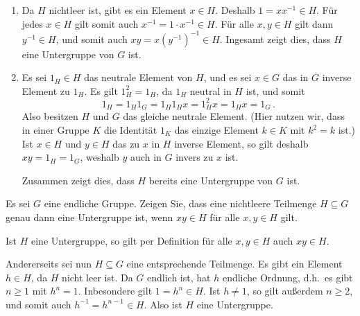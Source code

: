 \begin{solution}
  \begin{enumerate}
    \item
      Da $H$ nichtleer ist, gibt es ein Element $x \in H$.
      Deshalb $1 = x x^{-1} \in H$.
      Für jedes $x \in H$ gilt somit auch $x^{-1} = 1 \cdot x^{-1} \in H$.
      Für alle $x, y \in H$ gilt dann $y^{-1} \in H$, und somit auch $xy = x (y^{-1})^{-1} \in H$.
      Ingesamt zeigt dies, dass $H$ eine Untergruppe von $G$ ist.
    \item
      Es sei $1_H \in H$ das neutrale Element von $H$, und es sei $x \in G$ das in $G$ inverse Element zu $1_H$.
      Es gilt $1_H^2 = 1_H$, da $1_H$ neutral in $H$ ist, und somit
      \[
          1_H
        = 1_H 1_G
        = 1_H 1_H x
        = 1_H^2 x
        = 1_H x
        = 1_G \,.
      \]
      Also besitzen $H$ und $G$ das gleiche neutrale Element.
      (Hier nutzen wir, dass in einer Gruppe $K$ die Identität $1_K$ das einzige Element $k \in K$ mit $k^2 = k$ ist.)
      Ist $x \in H$ und $y \in H$ das zu $x$ in $H$ inverse Element, so gilt deshalb $xy = 1_H = 1_G$, weshalb $y$ auch in $G$ invers zu $x$ ist.
      
      Zusammen zeigt dies, dass $H$ bereits eine Untergruppe von $G$ ist.
  \end{enumerate}
\end{solution}


\begin{question}[subtitle = Untergruppen von endlichen Gruppen]
  Es sei $G$ eine endliche Gruppe.
  Zeigen Sie, dass eine nichtleere Teilmenge $H \subseteq G$ genau dann eine Untergruppe ist, wenn $xy \in H$ für alle $x,y \in H$ gilt.
\end{question}


\begin{solution}
  Ist $H$ eine Untergruppe, so gilt per Definition für alle $x, y \in H$ auch $xy \in H$.
  
  Andererseits sei nun $H \subseteq G$ eine entsprechende Teilmenge.
  Es gibt ein Element $h \in H$, da $H$ nicht leer ist.
  Da $G$ endlich ist, hat $h$ endliche Ordnung, d.h.\ es gibt $n \geq 1$ mit $h^n = 1$.
  Inbesondere gilt $1 = h^n \in H$.
  Ist $h \neq 1$, so gilt außerdem $n \geq 2$, und somit auch $h^{-1} = h^{n-1} \in H$.
  Also ist $H$ eine Untergruppe.
\end{solution}


